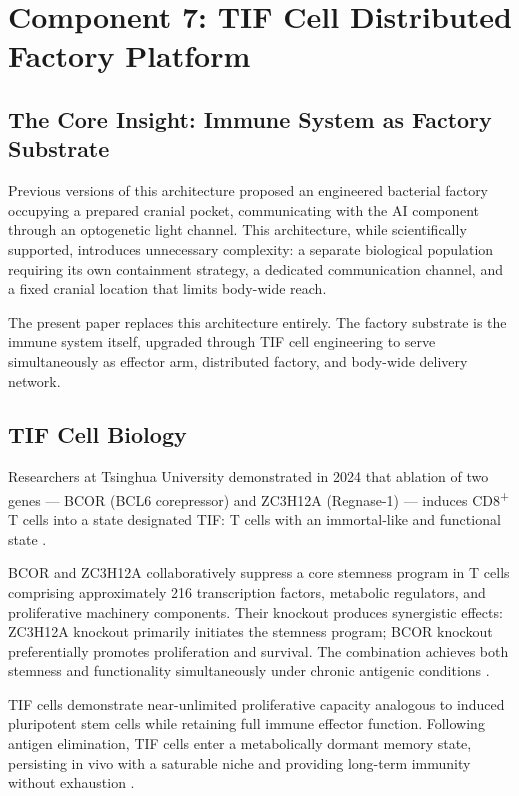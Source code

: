 \documentclass[12pt]{article}
\begin{document}
\section{Component 7: TIF Cell Distributed Factory Platform}
\label{sec:tif}

\subsection{The Core Insight: Immune System as Factory Substrate}

Previous versions of this architecture proposed an engineered bacterial factory occupying a prepared cranial pocket, communicating with the AI component through an optogenetic light channel. This architecture, while scientifically supported, introduces unnecessary complexity: a separate biological population requiring its own containment strategy, a dedicated communication channel, and a fixed cranial location that limits body-wide reach.

The present paper replaces this architecture entirely. The factory substrate is the immune system itself, upgraded through TIF cell engineering to serve simultaneously as effector arm, distributed factory, and body-wide delivery network.

\subsection{TIF Cell Biology}

Researchers at Tsinghua University demonstrated in 2024 that ablation of two genes --- BCOR (BCL6 corepressor) and ZC3H12A (Regnase-1) --- induces CD8\textsuperscript{+} T cells into a state designated TIF: T cells with an immortal-like and functional state \cite{tif_cells_2024}.

BCOR and ZC3H12A collaboratively suppress a core stemness program in T cells comprising approximately 216 transcription factors, metabolic regulators, and proliferative machinery components. Their knockout produces synergistic effects: ZC3H12A knockout primarily initiates the stemness program; BCOR knockout preferentially promotes proliferation and survival. The combination achieves both stemness and functionality simultaneously under chronic antigenic conditions \cite{tif_mechanism_2025}.

TIF cells demonstrate near-unlimited proliferative capacity analogous to induced pluripotent stem cells while retaining full immune effector function. Following antigen elimination, TIF cells enter a metabolically dormant memory state, persisting in vivo with a saturable niche and providing long-term immunity without exhaustion \cite{tif_cells_2024}.
\end{document}
